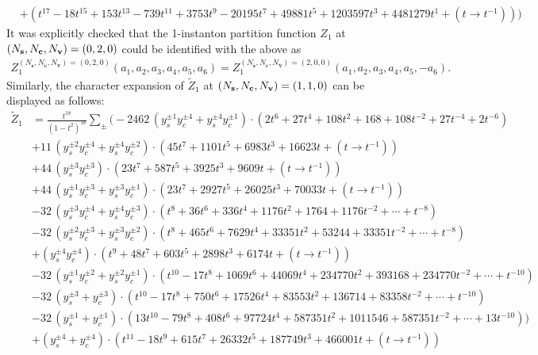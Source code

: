 \documentclass[letterpaper, 11pt]{article}
\newcommand{\nn}{\nonumber}
\begin{document}
{\begin{align}
  &+(t^{17}-18t^{15}+153t^{13}-739t^{11}+3753t^9-20195t^{7}+49881t^{5}+1203597t^{3}+4481279t^{1}+(t\rightarrow t^{-1}))\Big)\nn
\end{align}
It was explicitly checked that the 1-instanton partition function $Z_1$ at $(N_{\bf s},N_{\bf c}, N_{\bf v}) = (0,2,0)$ could be identified with the above as
\begin{align}
  {Z}_{1}^{(N_{\mathbf{s}},N_\mathbf{c},N_{\mathbf{v}}) = (0,2,0)}(a_1,a_2,a_3,a_4,a_5,a_6) = {Z}_{1}^{(N_{\mathbf{s}},N_\mathbf{c},N_{\mathbf{v}}) = (2,0,0)}(a_1,a_2,a_3,a_4,a_5,-a_6).
\end{align}
Similarly, the character expansion of $\tilde{Z}_1$ at $(N_{\bf s},N_{\bf c}, N_{\bf v}) = (1,1,0)$ can be displayed as follows:
\begin{align}
  \label{eq:so12-s1c1}
  \tilde{Z}_1&=\frac{t^{18}}{(1-t^2)^{18}}\sum_{\pm}\Big(
  -2462\,(y_s^{\pm1}y_c^{\pm4}+y_s^{\pm4}y_c^{\pm1})\cdot{(2t^6+27t^4+108t^2+168+108t^{-2}+27t^{-4}+2t^{-6})}\nn\\
  &+11\,(y_s^{\pm2}y_c^{\pm4}+y_s^{\pm4}y_c^{\pm2})\cdot{(45t^7+1101t^5+6983t^3+16623t+ (t\rightarrow t^{-1}))}\nn\\
  &+44\,(y_s^{\pm3}y_c^{\pm3})\cdot{(23t^7+587t^5+3925t^3+9609t+ (t\rightarrow t^{-1}))}\\
  &+44\,(y_s^{\pm1}y_c^{\pm3}+y_s^{\pm3}y_c^{\pm1})\cdot{(23t^7+2927t^5+26025t^3+70033t+(t\rightarrow t^{-1}))}\nn\\
  &-32\,(y_s^{\pm3}y_c^{\pm4}+y_s^{\pm4}y_c^{\pm3})\cdot{(t^8+36t^6+336t^4+1176t^2+1764+1176t^{-2}+\cdots+t^{-8})}\nn\\
  &-32\,(y_s^{\pm2}y_c^{\pm3}+y_s^{\pm3}y_c^{\pm2})\cdot{(t^8+465t^6+7629t^4+33351t^2+53244+33351t^{-2}+\cdots+t^{-8})}\nn\\
  &+(y_s^{\pm4}y_c^{\pm4})\cdot {(t^9+48t^7+603t^5+2898t^3+6174t+(t\rightarrow t^{-1}))}\nn\\
  &-32\,(y_s^{\pm1}y_c^{\pm2}+y_s^{\pm2}y_c^{\pm1})\cdot (t^{10}-17t^8+1069t^6+44069t^4+234770t^2+393168+234770t^{-2} +\cdots+t^{-10})\nn\\
  &-32\,(y_s^{\pm3}+y_c^{\pm3})\cdot{(t^{10}-17t^8+750t^6+17526t^4+83553t^2+136714+83358t^{-2}+\cdots+t^{-10})}\nn\\
  &-32\,(y_s^{\pm1}+y_c^{\pm1})\cdot (13t^{10}-79t^8+408t^6+97724t^4+587351t^2+1011546+587351t^{-2}+\cdots +13t^{-10}))\nn\\
  &+(y_s^{\pm4}+y_c^{\pm4})\cdot{(t^{11}-18t^9+615t^7+26332t^5+187749t^3+466001t+(t\rightarrow t^{-1}))}\nn\\

\end{align}}
\end{document}
